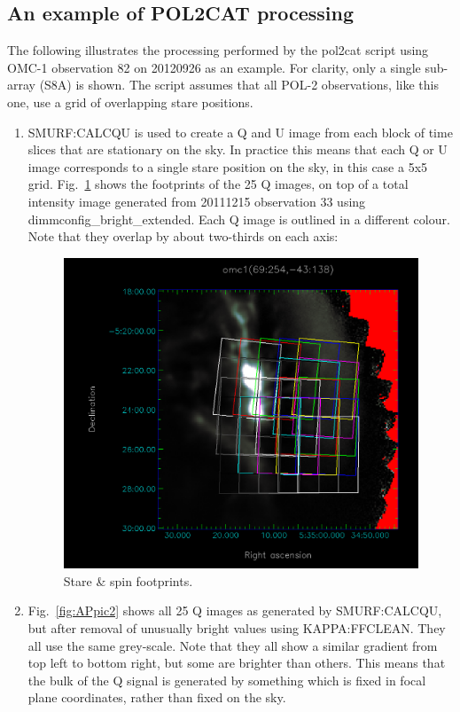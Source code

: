 \documentclass[twoside,11pt]{starlink}
\begin{document}
\subsection{An example of POL2CAT processing}
The following illustrates the processing performed by the pol2cat script
using OMC-1 observation 82 on 20120926 as an example. For clarity, only a
single sub-array (S8A) is shown. The script assumes that all POL-2
observations, like this one, use a grid of overlapping stare positions.

\begin{enumerate}
\item SMURF:CALCQU is used to create a Q and U image from each block of time
slices that are stationary on the sky. In practice this means that each Q
or U image corresponds to a single stare position on the sky, in this
case a 5x5 grid. Fig.~\ref{fig:APpic1} shows the footprints of the 25 Q images,
on top of a total intensity image generated from 20111215 observation 33
using dimmconfig\_bright\_extended. Each Q image is outlined in a different
colour. Note that they overlap by about two-thirds on each axis:

\begin{figure}
\includegraphics[width=\columnwidth]{APpic1}
\caption{Stare \& spin footprints.}
\label{fig:APpic1}
\end{figure}

\item Fig.~\ref{fig:APpic2} shows all 25 Q images as generated by SMURF:CALCQU,
but after removal of unusually bright values using KAPPA:FFCLEAN. They
all use the same grey-scale. Note that they all show a similar gradient
from top left to bottom right, but some are brighter than others. This
means that the bulk of the Q signal is generated by something which is
fixed in focal plane coordinates, rather than fixed on the sky.


\end{enumerate}
\end{document}
